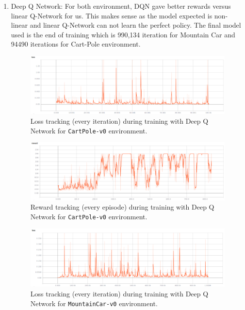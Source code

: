 \documentclass[12pt]{article}
\begin{document}
\begin{enumerate}
\item Deep Q Network: For both environment, DQN gave better rewards versus linear Q-Network for us. This makes sense as the model expected is non-linear and linear Q-Network can not learn the perfect policy. The final model used is the end of training which is 990,134 iteration for Mountain Car and 94490 iterations for Cart-Pole environment.
\begin{figure}[h]
  \centering
  \includegraphics[width=1\textwidth]{figures/CartPole_DQN_replay_loss.png}
  \caption{\label{fig:CartPole_DQN_replay_loss} Loss tracking (every iteration) during training with Deep Q Network for \texttt{CartPole-v0} environment.}
\end{figure}

\begin{figure}[h]
  \centering
  \includegraphics[width=1\textwidth]{figures/CartPole_DQN_replay_reward.png}
  \caption{\label{fig:CartPole_DQN_replay_reward} Reward tracking (every episode) during training with Deep Q Network for \texttt{CartPole-v0} environment.}
\end{figure}

\begin{figure}[h]
  \centering
  \includegraphics[width=1\textwidth]{figures/MountainCar_DQN_replay_loss.png}
  \caption{\label{fig:MountainCar_DQN_replay_loss} Loss tracking (every iteration) during training with Deep Q Network for \texttt{MountainCar-v0} environment.}
\end{figure}


\end{enumerate}
\end{document}
